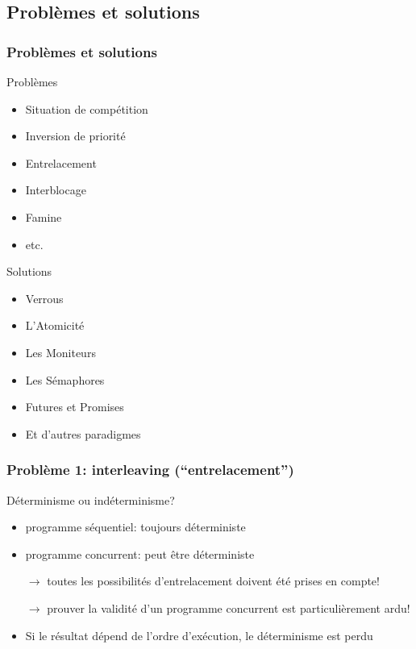 \documentclass{beamer}
\begin{document}
\subsection{Problèmes et solutions}
\begin{frame}
  \frametitle{Problèmes et solutions}
  \begin{minipage}{.49\textwidth}
    Problèmes
    \begin{itemize}
    \item Situation de compétition
    \item Inversion de priorité
    \item Entrelacement
    \item Interblocage
    \item Famine
    \item etc.
    \end{itemize}
  \end{minipage}
  \begin{minipage}{.49\textwidth}
    Solutions
    \begin{itemize}
    \item Verrous
    \item L'Atomicité
    \item Les Moniteurs
    \item Les Sémaphores
    \item Futures et Promises
    \item Et d'autres paradigmes
    \end{itemize}
  \end{minipage}
\end{frame} %
\begin{frame}
  \frametitle{Problème 1: \textbf{interleaving} (``entrelacement'')}
  Déterminisme ou indéterminisme?
  \begin{itemize}
  \item programme séquentiel: toujours déterministe
  \item programme concurrent: peut être déterministe
    \par$\rightarrow$
    toutes les possibilités d'entrelacement doivent été prises en compte!
    \par$\rightarrow$
    prouver la validité d'un programme concurrent est particulièrement ardu!
  \item Si le résultat dépend de l'ordre d'exécution, le déterminisme est perdu
  \end{itemize}
\end{frame} %
\end{document}
